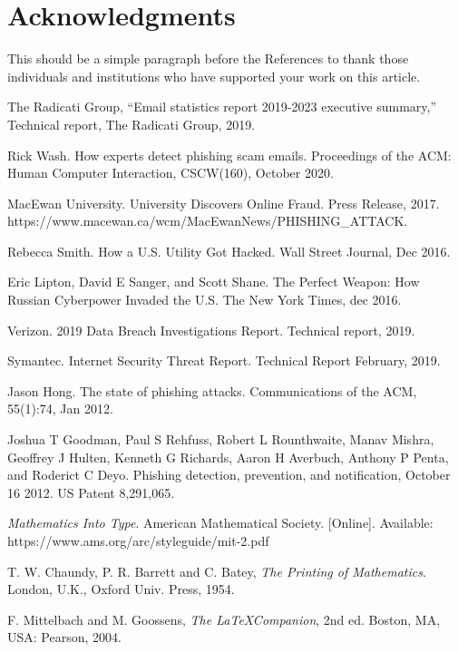 \documentclass[lettersize,journal]{IEEEtran}
\begin{document}
\section*{Acknowledgments}
This should be a simple paragraph before the References to thank those individuals and institutions who have supported your work on this article.

\begin{thebibliography}{1}
  

  The Radicati Group, ``Email statistics report 2019-2023 executive summary,'' Technical report, The Radicati Group, 2019.

  Rick Wash. How experts detect phishing scam emails. Proceedings of the ACM: Human Computer Interaction, CSCW(160), October 2020.

  MacEwan University. University Discovers Online Fraud. Press Release, 2017. https://www.macewan.ca/wcm/MacEwanNews/PHISHING\_ATTACK.

  Rebecca Smith. How a U.S. Utility Got Hacked. Wall Street Journal, Dec 2016.

  Eric Lipton, David E Sanger, and Scott Shane. The Perfect Weapon: How Russian Cyberpower Invaded the U.S. The New York Times, dec 2016.

  Verizon. 2019 Data Breach Investigations Report. Technical report, 2019.

  Symantec. Internet Security Threat Report. Technical Report February, 2019.

  Jason Hong. The state of phishing attacks. Communications of the ACM, 55(1):74, Jan 2012.

  Joshua T Goodman, Paul S Rehfuss, Robert L Rounthwaite, Manav Mishra, Geoffrey J Hulten, Kenneth G Richards, Aaron H Averbuch, Anthony P Penta, and Roderict C Deyo. Phishing detection, prevention, and notification, October 16 2012. US Patent 8,291,065.

  {\it{Mathematics Into Type}}. American Mathematical Society. [Online]. Available: https://www.ams.org/arc/styleguide/mit-2.pdf

  T. W. Chaundy, P. R. Barrett and C. Batey, {\it{The Printing of Mathematics}}. London, U.K., Oxford Univ. Press, 1954.

  F. Mittelbach and M. Goossens, {\it{The \LaTeX Companion}}, 2nd ed. Boston, MA, USA: Pearson, 2004.


\end{thebibliography}
\end{document}
